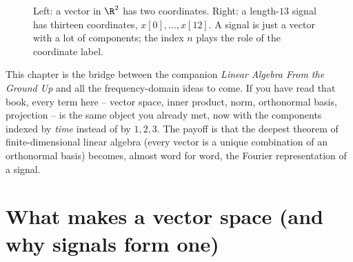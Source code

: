 \begin{figure}[H]
\centering
{}
\caption{Left: a vector in $\R^2$ has two coordinates. Right: a length-$13$ signal has thirteen
coordinates, $x[0],\dots,x[12]$. A signal is just a vector with a lot of components; the index $n$
plays the role of the coordinate label.}
\label{ch03:fig-arrow-to-signal}
\end{figure}

\begin{connectionbox}
This chapter is the bridge between the companion \emph{Linear Algebra From the Ground Up} and all
the frequency-domain ideas to come. If you have read that book, every term here -- vector space,
inner product, norm, orthonormal basis, projection -- is the same object you already met, now with
the components indexed by \emph{time} instead of by $1,2,3$. The payoff is that the deepest theorem
of finite-dimensional linear algebra (every vector is a unique combination of an orthonormal basis)
becomes, almost word for word, the Fourier representation of a signal.
\end{connectionbox}

\section{What makes a vector space (and why signals form one)}
\label{ch03:vector-space}

